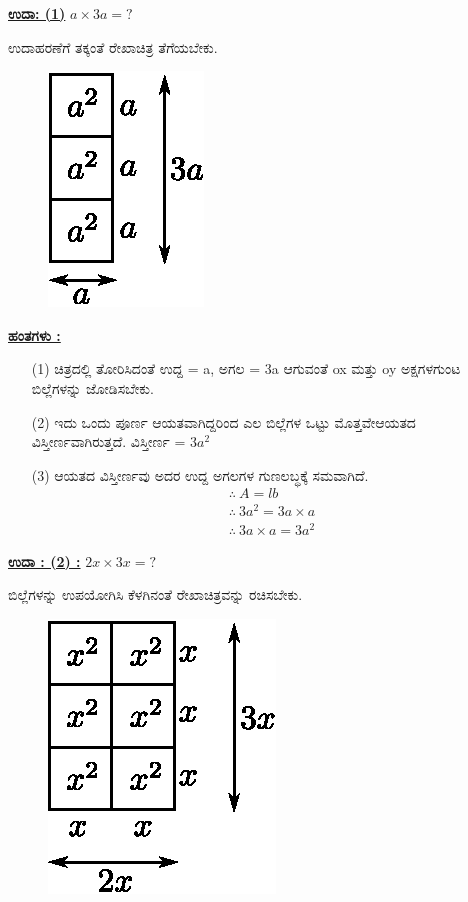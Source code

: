\noindent
{\textbf{\underline{ಉದಾ: (1)}}} $a \times 3a = ?$

ಉದಾಹರಣೆಗೆ ತಕ್ಕಂತೆ ರೇಖಾಚಿತ್ರ ತೆಗೆಯಬೇಕು.
\begin{figure}[H]
\centering
\includegraphics[scale=0.9]{src/figure/chap3/fig3-29a.eps}
\end{figure}

\noindent
{\textbf{\underline{ಹಂತಗಳು :}}}

\begin{itemize}
\item [(1)] ಚಿತ್ರದಲ್ಲಿ ತೋರಿಸಿದಂತೆ ಉದ್ದ = a, ಅಗಲ = 3a ಆಗುವಂತೆ ox ಮತ್ತು oy ಅಕ್ಷಗಳಗುಂಟ ಬಿಲ್ಲೆಗಳನ್ನು ಜೋಡಿಸಬೇಕು. 
\item [(2)] ಇದು ಒಂದು ಪೂರ್ಣ ಆಯತವಾಗಿದ್ದರಿಂದ ಎಲ ಬಿಲ್ಲೆಗಳ ಒಟ್ಟು ಮೊತ್ತವೇ\break ಆಯತದ ವಿಸ್ತೀರ್ಣವಾಗಿರುತ್ತದೆ. ವಿಸ್ತೀರ್ಣ = $3a^2$
\item [(3)] ಆಯತದ ವಿಸ್ತೀರ್ಣವು ಅದರ ಉದ್ದ ಅಗಲಗಳ ಗುಣಲಬ್ಧಕ್ಕೆ ಸಮವಾಗಿದೆ. 
\begin{gather*}
\therefore~ A = lb \\
\therefore~ 3a^2 = 3a \times a\\
\therefore~ 3a \times a = 3a^2
\end{gather*}

\end{itemize}

\medskip
\noindent
{\textbf{\underline{ಉದಾ : (2) :}}} $2x \times 3x = ?$

ಬಿಲ್ಲೆಗಳನ್ನು ಉಪಯೋಗಿಸಿ ಕೆಳಗಿನಂತೆ ರೇಖಾಚಿತ್ರವನ್ನು ರಚಿಸಬೇಕು.
\begin{figure}[H]
\centering
\includegraphics[scale=0.9]{src/figure/chap3/fig3-29b.eps}
\end{figure}

